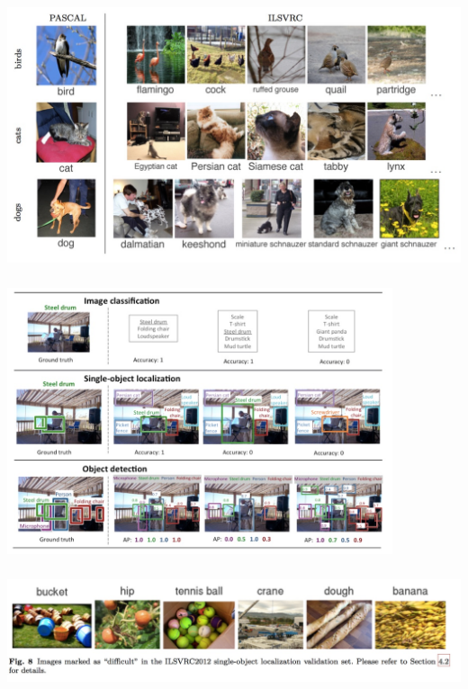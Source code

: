 \documentclass[xetex,mathserif,serif,aspectratio=169]{beamer}
\begin{document}
\begin{frame}[fragile] \frametitle{} \oldB \small

\begin{center}
\includegraphics[width=\textwidth]{img/ilsvrcCategories.jpg}
\end{center}

\end{frame}


\begin{frame}[fragile] \frametitle{} \oldB \small

\begin{center}
\includegraphics[width=0.85\textwidth]{img/ilsvrcTasks.jpg}
\end{center}

\end{frame}


\begin{frame}[fragile] \frametitle{} \oldB \small

\begin{center}
\includegraphics[width=\textwidth]{img/ilsvrcDifficult.jpg}
\end{center}

\end{frame}
\end{document}
